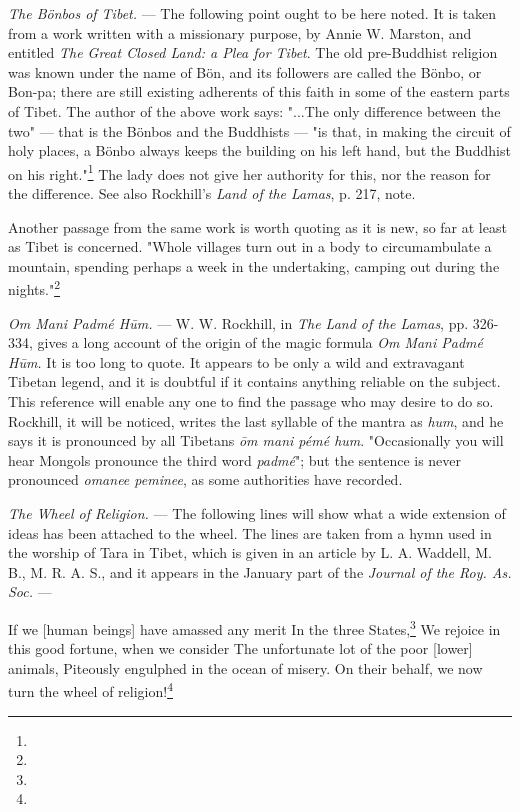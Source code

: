 \documentclass[a4paper, 11pt, oneside, polutonikogreek, english]{article}
\begin{document}
\emph{The Bönbos of Tibet.} --- The following point ought to be here noted. It is taken from a work written with a missionary purpose, by Annie W. Marston, and entitled \emph{The Great Closed Land: a Plea for Tibet}. The old pre-Buddhist religion was known under the name of Bön, and its followers are called the Bönbo, or Bon-pa; there are still existing adherents of this faith in some of the eastern parts of Tibet. The author of the above work says: "...The only difference between the two" --- that is the Bönbos and the Buddhists --- "is that, in making the circuit of holy places, a Bönbo always keeps the building on his left hand, but the Buddhist on his right."\footnote{} The lady does not give her authority for this, nor the reason for the difference. See also Rockhill's \emph{Land of the Lamas}, p. 217, note.

Another passage from the same work is worth quoting as it is new, so far at least as Tibet is concerned. "Whole villages turn out in a body to circumambulate a mountain, spending perhaps a week in the undertaking, camping out during the nights."\footnote{}

\emph{Om Mani Padmé Hūm.} --- W. W. Rockhill, in \emph{The Land of the Lamas}, 
pp. 326-334, gives a long account of the origin of the magic formula \emph{Om Mani Padmé Hūm.} It is too long to quote. It appears to be only a wild 
and extravagant Tibetan legend, and it is doubtful if it contains anything reliable on the subject. This reference will enable any one to find the passage who may desire to do so. Rockhill, it will be noticed, writes the last syllable of the mantra as \emph{hum}, and he says it is pronounced by all Tibetans \emph{ōm mani pémé hum}. "Occasionally you will hear Mongols pronounce the third word \emph{padmé}"; but the sentence is never pronounced \emph{omanee peminee}, as some authorities have recorded.

\emph{The Wheel of Religion.} --- The following lines will show what a wide extension of ideas has been attached to the wheel. The lines are taken from a hymn used in the worship of Tara in Tibet, which is given in an article by L. A. Waddell, M. B., M. R. A. S., and it appears in the January part of the \emph{Journal of the Roy. As. Soc.} ---

If we [human beings] have amassed any merit  
In the three States,\footnote{}  
We rejoice in this good fortune, when we consider  
The unfortunate lot of the poor [lower] animals,  
Piteously engulphed in the ocean of misery.  
On their behalf, we now turn the wheel of religion!\footnote{}
\end{document}
